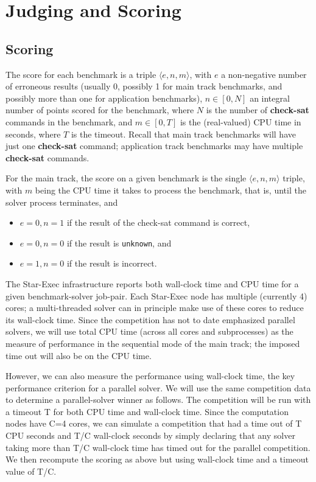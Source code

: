 \documentclass[12pt]{article}
\newcommand{\akey}[1]{\textbf{#1}}
\begin{document}
\section{Judging and Scoring}
\label{sec:judging}

\subsection{Scoring}

The score for each benchmark is a triple $\langle e,n,m\rangle$, with
$e$ a non-negative number of erroneous results (usually 0, possibly 1 for main track benchmarks, and possibly more than one for application benchmarks),
$n\in[0,N]$ an integral number of points scored for the benchmark,
where $N$ is the number of \akey{check-sat} commands
in the benchmark, and $m\in[0,T]$ is the (real-valued) CPU time in seconds, where $T$ is
the timeout.  Recall that main track benchmarks will have just one \akey{check-sat} command;
application track benchmarks may have multiple \akey{check-sat} commands.

For the main track, the score on a given benchmark is the single $\langle e,n,m\rangle$ triple, with $m$ being the CPU time it takes to process the benchmark, that is, until the solver process terminates, and
\begin{itemize}
\item $e=0, n=1$ if the result of the check-sat command is correct,
\item $e=0, n=0$ if the result is {\tt unknown}, and
\item $e=1, n=0$ if the result is incorrect.
\end{itemize}

The Star-Exec infrastructure reports both wall-clock time and CPU time for a given benchmark-solver job-pair. Each Star-Exec node has multiple (currently 4) cores; a multi-threaded solver can in principle make use of these cores to reduce its wall-clock time. Since the competition has not to date emphasized parallel solvers, we will use total CPU time (across all cores and subprocesses) as the measure of performance in the sequential mode of the main track; the imposed time out will also be on the CPU time.

However, we can also measure the performance using wall-clock time, the key performance criterion for a parallel solver.
We will use the same competition data to determine a parallel-solver winner as follows. The competition will be run with a timeout T for both CPU time and wall-clock time. Since the computation nodes have C=4 cores, we can simulate a competition that had a time out of T CPU seconds and T/C wall-clock seconds by simply declaring that any solver taking more than T/C wall-clock time has timed out for the parallel competition. We then recompute the scoring as above but using wall-clock time and a timeout value of T/C. 
\end{document}
